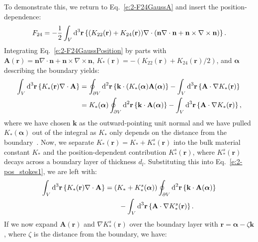 To demonstrate this, we return to Eq.~\ref{e:2-F24GaussA} and insert the position-dependence:
\begin{equation}
  F_{24} = -\frac{1}{2}\int_{V}\textup{d}^3\mathbf{r} \left \{ (K_{22} (\mathbf{r}) + K_{24}(\mathbf{r})) \nabla \cdot (\mathbf{n} \nabla \cdot \mathbf{n} + \mathbf{n} \times \nabla \times \mathbf{n}) \right \}.\label{e:2-F24GaussPosition}
\end{equation}
Integrating Eq.~\ref{e:2-F24GaussPosition} by parts with $\mathbf{A}(\mathbf{r}) = \mathbf{n} \nabla \cdot \mathbf{n} + \mathbf{n} \times \nabla \times \mathbf{n}$, \newline $K_*(\mathbf{r}) = -(K_{22} (\mathbf{r}) + K_{24}(\mathbf{r})/2)$, and $\bm{\alpha}$ describing the boundary yields:
\begin{align}
  \int_{V}\textup{d}^3\mathbf{r} \left \{ K_{*} (\mathbf{r}) \nabla \cdot \mathbf{A} \right \} &=
  \oint_{\partial V}\textup{d}^2 \mathbf{r} \left \{ \mathbf{k} \cdot (K_{*} (\bm{\alpha}) \mathbf{A}(\bm{\alpha}) \right \} -  \int_{V} \textup{d}^3\mathbf{r} \left \{ \mathbf{A} \cdot \nabla K_{*} (\mathbf{r}) \right \}  \\ &=
  K_*(\bm{\alpha}) \oint_{\partial V} \textup{d}^2\mathbf{r} \left \{ \mathbf{k} \cdot \mathbf{A}(\bm{\alpha})\right \} - \int_{V} \textup{d}^3\mathbf{r} \left \{ \mathbf{A} \cdot \nabla K_{*} (\mathbf{r}) \right \}, \label{e:2-pos_stokes1}
\end{align}
where we have chosen $\mathbf{k}$ as the outward-pointing unit normal and we have pulled $K_*(\bm{\alpha})$ out of the integral as $K_*$ only depends on the distance from the boundary~\cite{RN55}.
Now, we separate $K_*(\mathbf{r}) = K_* + K_*^s(\mathbf{r})$ into the bulk material constant $K_*$ and the position-dependent contribution $K_*^s(\mathbf{r})$, where $K_*^s(\mathbf{r})$ decays across a boundary layer of thickness $d_l$.
Substituting this into Eq.~\ref{e:2-pos_stokes1}, we are left with:
\begin{align}
  \int_{V}\textup{d}^3\mathbf{r} \left \{ K_{*} (\mathbf{r}) \nabla \cdot \mathbf{A} \right \} &=
  (K_*+K_*^s(\bm{\alpha})) \oint_{\partial V} \textup{d}^2\mathbf{r} \left \{ \mathbf{k} \cdot \mathbf{A}(\bm{\alpha})\right \} \nonumber \\&
  \quad \quad - \int_{V} \textup{d}^3\mathbf{r} \left \{ \mathbf{A} \cdot \nabla K_{*}^s (\mathbf{r}) \right \}. \label{e:2-pos_stokes2}
\end{align}
If we now expand $\mathbf{A}(\mathbf{r})$ and $\nabla K_*^s(\mathbf{r})$ over the boundary layer with $\mathbf{r} = \bm{\alpha} - \zeta \mathbf{k}$, where $\zeta$ is the distance from the boundary, we have:
